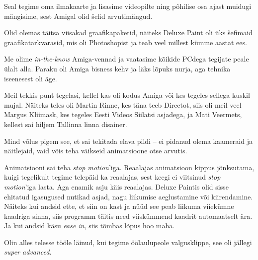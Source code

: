 Seal tegime oma ilmakaarte ja lisasime videopilte ning põhilise osa ajast 
muidugi mängisime, sest Amigal olid šefid arvutimängud. 


Olid olemas täitsa viisakad graafikapaketid, näiteks Deluxe Paint oli üks šefimaid graafikatarkvarasid, mis oli 
Photoshopist ja teab veel millest kümme aastat ees. 

Me olime \emph{in-the-know} Amiga-vennad ja vaatasime kõikide 
PCdega tegijate peale ülalt alla. Paraku oli Amiga bisness kehv ja 
läks lõpuks nurja, aga tehnika iseenesest oli äge. 

Meil tekkis punt tegelasi, kellel kas oli kodus Amiga või kes 
tegeles sellega kuskil mujal. Näiteks teles oli Martin Rinne, kes 
täna teeb Directot,
siis oli meil veel Margus Kliimask, kes tegeles 
Eesti 
Videos Siilatsi asjadega, ja Mati 
Veermets, kellest sai hiljem Tallinna linna disainer.

Mind võlus pigem see, et sai tekitada 
elava pildi -- ei pidanud olema kaameraid ja näitlejaid, vaid 
võis teha väikseid animatsioone otse arvutis.


Animatsiooni sai teha \emph{stop 
motion}'iga. Reaalajas animatsioon kippus jõnksutama, kuigi 
tegelikult tegime telepäid ka reaalajas, sest keegi ei viitsinud 
\emph{stop motion}'iga lasta. Aga enamik asju käis 
reaalajas. Deluxe Paintis olid sisse ehitatud igasugused 
nutikad asjad, nagu liikumise aeglustamine või kiirendamine. Näiteks kui andsid 
ette, et siin on kast ja nüüd see peab liikuma 
viiekümne kaadriga sinna, siis programm täitis need 
viiskümmend kaadrit automaatselt ära. Ja kui andsid käsu \emph{ease in}, siis 
tõmbas lõpus hoo maha. 

Olin alles telesse tööle läinud, kui tegime 
öölaulupeole 
valgusklippe, see oli jällegi \emph{super advanced}.


